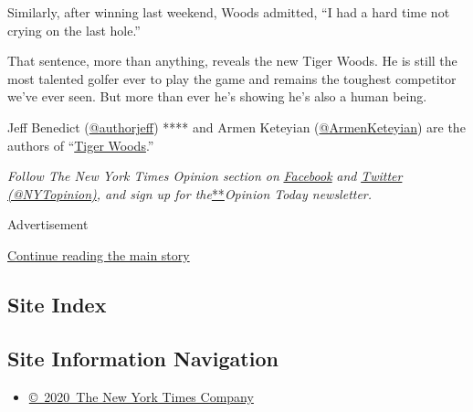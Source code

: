Similarly, after winning last weekend, Woods admitted, ``I had a hard
time not crying on the last hole.''

That sentence, more than anything, reveals the new Tiger Woods. He is
still the most talented golfer ever to play the game and remains the
toughest competitor we've ever seen. But more than ever he's showing
he's also a human being.

Jeff Benedict (\href{https://twitter.com/authorjeff}{@authorjeff}) ****
and Armen Keteyian
(\href{https://twitter.com/ArmenKeteyian}{@ArmenKeteyian}) are the
authors of
``\href{http://www.simonandschuster.com/books/Tiger-Woods/Jeff-Benedict/9781501126420}{Tiger
Woods}.''

\emph{Follow The New York Times Opinion section on}
\href{https://www.facebookcorewwwi.onion/nytopinion}{\emph{Facebook}}
\emph{and} \href{http://twitter.com/NYTOpinion}{\emph{Twitter
(@NYTopinion)}}\emph{, and sign up for
the}\href{http://www.nytimes3xbfgragh.onion/newsletters/opiniontoday/}{**}\emph{Opinion
Today newsletter.}

Advertisement

\protect\hyperlink{after-bottom}{Continue reading the main story}

\hypertarget{site-index}{%
\subsection{Site Index}\label{site-index}}

\hypertarget{site-information-navigation}{%
\subsection{Site Information
Navigation}\label{site-information-navigation}}

\begin{itemize}
\tightlist
\item
  \href{https://help.nytimes3xbfgragh.onion/hc/en-us/articles/115014792127-Copyright-notice}{©~2020~The
  New York Times Company}
\end{itemize}

